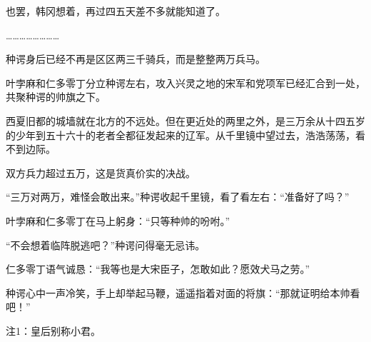 也罢，韩冈想着，再过四五天差不多就能知道了。

……………………

种谔身后已经不再是区区两三千骑兵，而是整整两万兵马。

叶孛麻和仁多零丁分立种谔左右，攻入兴灵之地的宋军和党项军已经汇合到一处，共聚种谔的帅旗之下。

西夏旧都的城墙就在北方的不远处。但在更近处的两里之外，是三万余从十四五岁的少年到五十六十的老者全都征发起来的辽军。从千里镜中望过去，浩浩荡荡，看不到边际。

双方兵力超过五万，这是货真价实的决战。

“三万对两万，难怪会敢出来。”种谔收起千里镜，看了看左右：“准备好了吗？”

叶孛麻和仁多零丁在马上躬身：“只等种帅的吩咐。”

“不会想着临阵脱逃吧？”种谔问得毫无忌讳。

仁多零丁语气诚恳：“我等也是大宋臣子，怎敢如此？愿效犬马之劳。”

种谔心中一声冷笑，手上却举起马鞭，遥遥指着对面的将旗：“那就证明给本帅看吧！”

注1：皇后别称小君。

